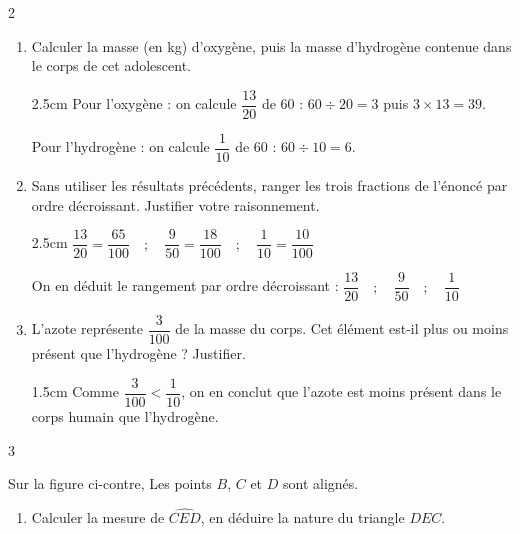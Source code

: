 \documentclass[a4paper]{book}
\begin{document}
{\begin{exerciceNote}{2}
        \begin{enumerate}
            \item Calculer la masse (en kg) d'oxygène, puis la masse d'hydrogène contenue dans le corps de cet adolescent.
            \begin{ZoneReponse}{2.5cm}
                Pour l'oxygène : on calcule $\dfrac{13}{20}$ de 60 : $60\div20=3$ puis $3\times13=39$.

                \medskip

                Pour l'hydrogène : on calcule $\dfrac{1}{10}$ de 60 : $60\div10=6$.
            \end{ZoneReponse}
            
            \item Sans utiliser les résultats précédents, ranger les trois fractions de l'énoncé par ordre décroissant. Justifier votre raisonnement.
            \begin{ZoneReponse}{2.5cm}
                $\dfrac{13}{20}=\dfrac{65}{100} \quad ; \quad \dfrac{9}{50}=\dfrac{18}{100} \quad ; \quad \dfrac{1}{10}=\dfrac{10}{100}$

                \medskip

                On en déduit le rangement par ordre décroissant : $\dfrac{13}{20} \quad ; \quad \dfrac{9}{50} \quad ; \quad \dfrac{1}{10}$
            \end{ZoneReponse}
            
            \item L'azote représente $\dfrac{3}{100}$ de la masse du corps. Cet élément est-il plus ou moins présent que l'hydrogène ? Justifier.
            \begin{ZoneReponse}{1.5cm}
                Comme $\dfrac{3}{100}<\dfrac{1}{10}$, on en conclut que l'azote est moins présent dans le corps humain que l'hydrogène.
            \end{ZoneReponse}
        \end{enumerate}
    \end{exerciceNote}


    \begin{exerciceNote}{3}
        \begin{minipage}{0.65\linewidth}
            Sur la figure ci-contre, Les points $B$, $C$ et $D$ sont alignés.
            
            \begin{enumerate}[leftmargin=*]
                \item Calculer la mesure de $\widehat{CED}$, en déduire la nature du triangle $DEC$.
                

\end{enumerate}
\end{minipage}
\end{exerciceNote}}
\end{document}
